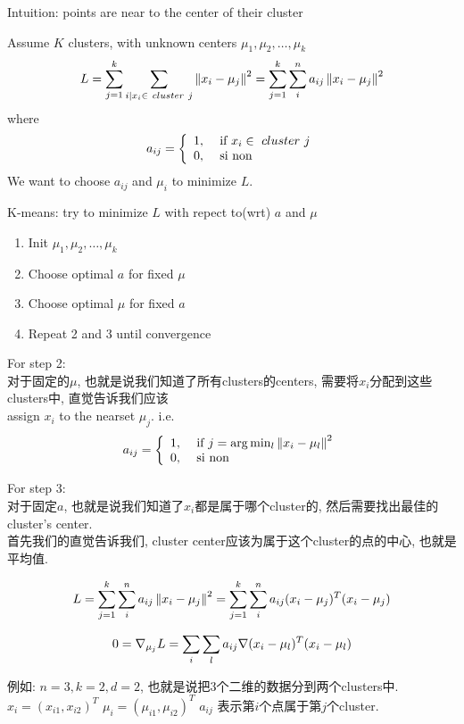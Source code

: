 \documentclass{article}
\begin{document}
Intuition: points are near to the center of their cluster

Assume $K$ clusters, with unknown centers $\mu_1, \mu_2, \ldots, \mu_k$
$$
L
= \sum_{j = 1}^k \sum_{i | x_i \in\ cluster\ j}\left\Vert x_i - \mu_j\right\Vert^2
= \sum_{j = 1}^k \sum_i^n a_{ij}\left\Vert x_i - \mu_j\right\Vert^2
$$
where
$$
a_{ij} =
\left\{
  \begin{array}{ll}
    1, & \textrm{\ if } x_i \in\ cluster\ j\\
    0, & \textrm{ si non}
  \end{array}
\right.
$$
We want to choose $a_{ij}$ and $\mu_i$ to minimize $L$.

K-means: try to minimize $L$ with repect to(wrt) $a$ and $\mu$
\begin{enumerate}
\item Init $\mu_1, \mu_2, \ldots, \mu_k$
\item Choose optimal $a$ for fixed $\mu$
\item Choose optimal $\mu$ for fixed $a$
\item Repeat 2 and 3 until convergence
\end{enumerate}

For step 2:\\
对于固定的$\mu$, 也就是说我们知道了所有clusters的centers, 需要将$x_i$分配到这些clusters中, 直觉告诉我们应该\\
assign $x_i$ to the nearset $\mu_j$. i.e.
$$
a_{ij} =
\left\{
  \begin{array}{ll}
  1, & \textrm{\ if } j = \arg \min_l \left\Vert x_i - \mu_l\right\Vert^2\\
    0, & \textrm{ si non}
  \end{array}
\right.
$$

For step 3:\\
对于固定$a$, 也就是说我们知道了$x_i$都是属于哪个cluster的, 然后需要找出最佳的cluster's center.\\
首先我们的直觉告诉我们, cluster center应该为属于这个cluster的点的中心, 也就是平均值.

$$
\begin{aligned}
\end{aligned}
L
= \sum_{j = 1}^k \sum_i^n a_{ij}\left\Vert x_i - \mu_j\right\Vert^2
= \sum_{j = 1}^k \sum_i^n a_{ij}(x_i - \mu_j)^T (x_i - \mu_j)
$$

$$
0 = \nabla _{\mu_j}{L} = \sum_i \sum_l a_{ij} \nabla (x_i - \mu_l)^T (x_i - \mu_l)
$$

例如: $n=3, k=2, d=2$, 也就是说把3个二维的数据分到两个clusters中.\\
$x_i = (x_{i1}, x_{i2})^T$
$\mu_i = (\mu_{i1}, \mu_{i2})^T$
$a_{ij}$ 表示第$i$个点属于第$j$个cluster.
\end{document}
